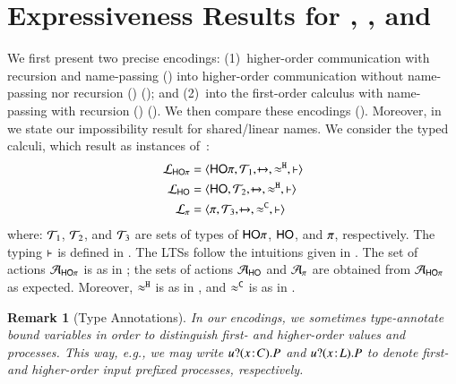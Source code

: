 \documentclass[preprint,11pt]{elsarticle}
\newtheorem{remark}{Remark}[section]
\begin{document}
{{%

\section{Expressiveness Results for \HOp, \HO, and \sessp}
\label{sec:positive}
%
 We first present two %
 precise encodings: 
(1)~higher-order communication with recursion and name-passing   (\HOp) into 
higher-order communication without name-passing nor recursion (\HO) (); and 
(2)~\HOp into the first-order calculus with name-passing  
with recursion (\sessp) ().
We then compare these  encodings (). 
Moreover, in  we state our impossibility result for shared/linear names.
We consider the typed calculi, which result as instances of~:
\begin{align*}
	\mathcal{L}_{\mathsf{HO}\pi} & =\langle \mathsf{HO}\pi, {\cal{T}}_1, \xmapsto{~}, \approx^\mathtt{H}, \vdash \rangle
	\\
	\mathcal{L}_{\mathsf{HO}} & =\langle \mathsf{HO}, {\cal{T}}_2, \xmapsto{~}, \approx^\mathtt{H}, \vdash \rangle
	\\
	\mathcal{L}_{\pi} & =\langle \pi, {\cal{T}}_3, \xmapsto{~}, \approx^\mathtt{C}, \vdash \rangle
\end{align*}
where: 
${\cal{T}}_1$, ${\cal{T}}_2$, 
and ${\cal{T}}_3$
are sets of types of $\mathsf{HO}\pi$, $\mathsf{HO}$, and $\pi$, respectively. 
The typing $\vdash$ is defined in 
.
The LTSs follow the intuitions given in .
The set of actions $\mathcal{A}_{\mathsf{HO}\pi}$ is as in ; the sets of actions $\mathcal{A}_\mathsf{HO}$ and $\mathcal{A}_\pi$ 
are obtained from $\mathcal{A}_{\mathsf{HO}\pi}$ 
as expected.
Moreover, 
$\approx^\mathtt{H}$ is as in , and 
$\approx^\mathtt{C}$ is as in .

\begin{remark}[Type Annotations]\label{r:types}
In our encodings, we sometimes type-annotate
bound variables in order to distinguish first- and higher-order values and processes.
This way, e.g., 
we may write $u ? (x \! : \! C) . P$
and 
$u ? (x \! : \! L) . P$ to denote first- and higher-order input prefixed processes, respectively.
\end{remark}

}}
\end{document}
